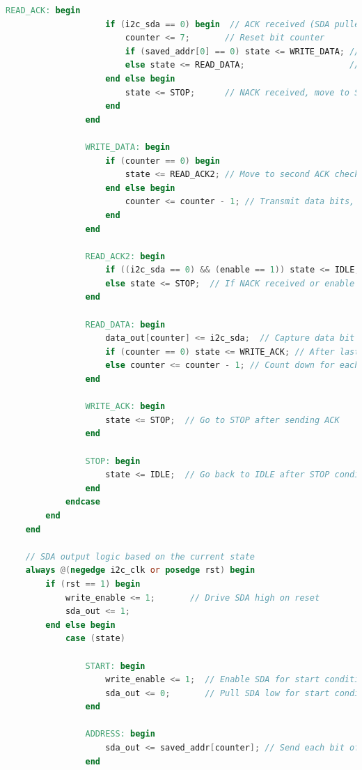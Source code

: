 \documentclass[a4paper,12pt]{report}
\begin{document}
\begin{lstlisting}[language=Verilog, caption={I2C Master Module in Verilog}, label=lst:i2c_master]
                READ_ACK: begin
                    if (i2c_sda == 0) begin  // ACK received (SDA pulled low by slave)
                        counter <= 7;       // Reset bit counter
                        if (saved_addr[0] == 0) state <= WRITE_DATA; // If RW=0, go to write mode
                        else state <= READ_DATA;                     // If RW=1, go to read mode
                    end else begin
                        state <= STOP;      // NACK received, move to STOP state
                    end
                end

                WRITE_DATA: begin
                    if (counter == 0) begin
                        state <= READ_ACK2; // Move to second ACK check after data transmission
                    end else begin
                        counter <= counter - 1; // Transmit data bits, count down
                    end
                end

                READ_ACK2: begin
                    if ((i2c_sda == 0) && (enable == 1)) state <= IDLE; // Return to IDLE on ACK
                    else state <= STOP;  // If NACK received or enable low, go to STOP
                end

                READ_DATA: begin
                    data_out[counter] <= i2c_sda;  // Capture data bit from SDA line
                    if (counter == 0) state <= WRITE_ACK; // After last bit, go to WRITE_ACK
                    else counter <= counter - 1; // Count down for each bit received
                end

                WRITE_ACK: begin
                    state <= STOP;  // Go to STOP after sending ACK
                end

                STOP: begin
                    state <= IDLE;  // Go back to IDLE after STOP condition
                end
            endcase
        end
    end

    // SDA output logic based on the current state
    always @(negedge i2c_clk or posedge rst) begin
        if (rst == 1) begin
            write_enable <= 1;       // Drive SDA high on reset
            sda_out <= 1;
        end else begin
            case (state)
                
                START: begin
                    write_enable <= 1;  // Enable SDA for start condition
                    sda_out <= 0;       // Pull SDA low for start condition
                end
                
                ADDRESS: begin
                    sda_out <= saved_addr[counter]; // Send each bit of the address and RW bit
                end
                

\end{lstlisting}
\end{document}
